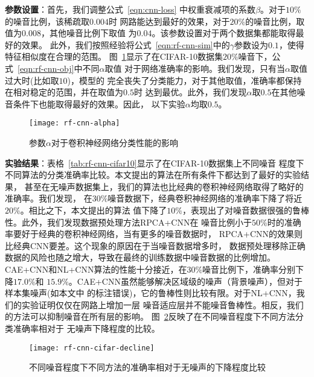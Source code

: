 \textbf{参数设置}：首先，我们调整公式~\eqref{eqn:cnn-loss}
中权重衰减项的系数$\beta$。对于$10\%$的噪音比例，该稀疏取$0.004$时
网路能达到最好的效果，对于$20\%$的噪音比例，取值为$0.008$，其他噪音比例下取值
为$0.04$。该参数设置对于两个数据集都能取得最好的效果。
此外，我们按照经验将公式~\eqref{eqn:rf-cnn-sim}中的$\gamma$参数设为$0.1$，使得特征相似度在合理的范围。
图~\ref{fig:rf-cnn-alpha}显示了在CIFAR-10数据集$20\%$噪音下，公式~\eqref{eqn:rf-cnn-obj}中不同$\alpha$取值
对于网络准确率的影响。我们发现，只有当$\alpha$取值过大时(比如取$10$)，模型的
完全丧失了分类能力，对于其他取值，准确率都保持在相对稳定的范围，并在取值为$0.5$时
达到最优。此外，我们发现$\alpha$取$0.5$在其他噪音条件下也能取得最好的效果。因此，
以下实验$\alpha$均取$0.5$。
\begin{figure}[ht]
    \center
    \texttt{[image: rf-cnn-alpha]}
    \caption{参数$\alpha$对于卷积神经网络分类性能的影响}\label{fig:rf-cnn-alpha}
\end{figure}

\textbf{实验结果}：表格~\ref{tab:rf-cnn-cifar10}显示了在CIFAR-10数据集上不同噪音
程度下不同算法的分类准确率比较。本文提出的算法在所有条件下都达到了最好的实验结果，
甚至在无噪声数据集上，我们的算法也比经典的卷积神经网络取得了略好的准确率。我们发现，
在$30\%$噪音数据下，经典卷积神经网络的准确率下降了将近$20\%$。相比之下，本文提出的算法
值下降了$10\%$，表现出了对噪音数据很强的鲁棒性。此外，我们发现数据预处理方法RPCA+CNN在
噪音比例小于$50\%$时的准确率要好于经典的卷积神经网络，当有更多的噪音数据时，
RPCA+CNN的效果则比经典CNN要差。这个现象的原因在于当噪音数据增多时，
数据预处理移除正确数据的风险也随之增大，导致在最终的训练数据中噪音数据的比例增加。
CAE+CNN和NL+CNN算法的性能十分接近，在$30\%$噪音比例下，准确率分别下降$17.0\%$和
$15.9\%$。CAE+CNN虽然能够解决区域级的噪声（背景噪声），但对于样本集噪声(如本文中
的标注错误)，它的鲁棒性则比较有限。对于NL+CNN，我们的实验证明仅仅在网路上增加一层
噪音适应层并不能噪音鲁棒性。相反，我们的方法可以抑制噪音在所有层的影响。
图~\ref{fig:rf-cnn-cifar-decline}反映了在不同噪音程度下不同方法分类准确率相对于
无噪声下降程度的比较。
\begin{figure}[ht]
    \center
    \texttt{[image: rf-cnn-cifar-decline]}
    \caption{不同噪音程度下不同方法的准确率相对于无噪声的下降程度比较}
    \label{fig:rf-cnn-cifar-decline}
\end{figure}

